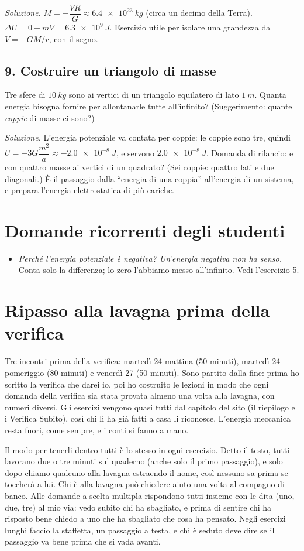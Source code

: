 \documentclass[11pt]{report}
\begin{document}
\emph{Soluzione.} $M = -\dfrac{V R}{G} \approx \SI{6.4e23}{kg}$ (circa un
decimo della Terra). $\Delta U = 0 - mV = \SI{6.3e9}{J}$. Esercizio utile
per isolare una grandezza da $V = -GM/r$, con il segno.

\subsection*{9. Costruire un triangolo di masse}
Tre sfere di $\SI{10}{kg}$ sono ai vertici di un triangolo equilatero di
lato $\SI{1}{m}$. Quanta energia bisogna fornire per allontanarle tutte
all'infinito? (Suggerimento: quante \emph{coppie} di masse ci sono?)

\emph{Soluzione.} L'energia potenziale va contata per coppie: le coppie sono
tre, quindi $U = -3G\dfrac{m^2}{a} \approx \SI{-2.0e-8}{J}$, e servono
$\SI{2.0e-8}{J}$. Domanda di rilancio: e con quattro masse ai vertici di un
quadrato? (Sei coppie: quattro lati e due diagonali.) È il passaggio dalla
``energia di una coppia'' all'energia di un sistema, e prepara l'energia
elettrostatica di più cariche.

\section*{Domande ricorrenti degli studenti}
\begin{itemize}
  \item \emph{Perché l'energia potenziale è negativa? Un'energia negativa non
  ha senso.} Conta solo la differenza; lo zero l'abbiamo messo all'infinito.
  Vedi l'esercizio 5.
\end{itemize}

\section*{Ripasso alla lavagna prima della verifica}

Tre incontri prima della verifica: martedì 24 mattina (50 minuti), martedì
24 pomeriggio (80 minuti) e venerdì 27 (50 minuti). Sono partito dalla
fine: prima ho scritto la verifica che darei io, poi ho costruito le
lezioni in modo che ogni domanda della verifica sia stata provata almeno
una volta alla lavagna, con numeri diversi. Gli esercizi vengono quasi
tutti dal capitolo del sito (il riepilogo e i Verifica Subito), così chi
li ha già fatti a casa li riconosce. L'energia meccanica resta fuori, come
sempre, e i conti si fanno a mano.

Il modo per tenerli dentro tutti è lo stesso in ogni esercizio. Detto il
testo, tutti lavorano due o tre minuti sul quaderno (anche solo il primo
passaggio), e solo dopo chiamo qualcuno alla lavagna estraendo il nome, così
nessuno sa prima se toccherà a lui. Chi è alla lavagna può chiedere aiuto
una volta al compagno di banco. Alle domande a scelta multipla rispondono
tutti insieme con le dita (uno, due, tre) al mio via: vedo subito chi ha
sbagliato, e prima di sentire chi ha risposto bene chiedo a uno che ha
sbagliato che cosa ha pensato. Negli esercizi lunghi faccio la staffetta,
un passaggio a testa, e chi è seduto deve dire se il passaggio va bene
prima che si vada avanti.
\end{document}
